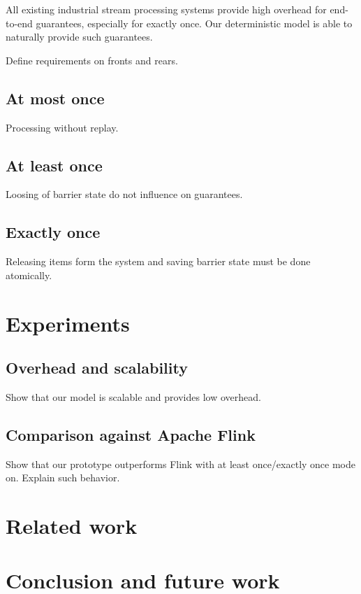 \documentclass[sigconf]{acmart}
\theoremstyle{remark}
\begin{document}
All existing industrial stream processing systems provide high overhead for end-to-end guarantees, especially for exactly once. Our deterministic model is able to naturally provide such guarantees.

Define requirements on fronts and rears.

\subsection{At most once}
Processing without replay.

\subsection{At least once}
Loosing of barrier state do not influence on guarantees.

\subsection{Exactly once}
Releasing items form the system and saving barrier state must be done atomically.

\section {Experiments}

\subsection{Overhead and scalability}
Show that our model is scalable and provides low overhead.

\subsection{Comparison against Apache Flink}
Show that our prototype outperforms Flink with at least once/exactly once mode on. Explain such behavior.

\section {Related work}

\section {Conclusion and future work}



\end{document}
